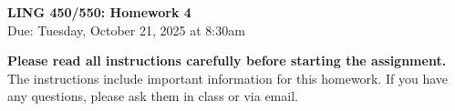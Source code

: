 \documentclass[12pt, letterpaper]{article}
\begin{document}


\begin{center}
    {\Large \textbf{LING 450/550: Homework 4}}\\
    {\large Due: Tuesday, October 21, 2025 at 8:30am}
\end{center}
\thispagestyle{fancy}



\textbf{Please read all instructions carefully before starting the assignment.} The instructions include important information for this homework. If you have any questions, please ask them in class or via email.
\end{document}
